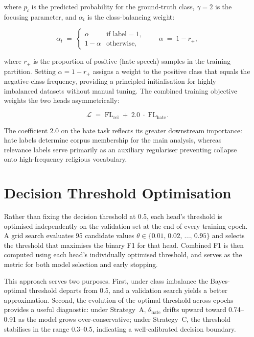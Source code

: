 \documentclass[../CLthesis.tex]{subfiles}
\begin{document}
\noindent where $p_t$ is the predicted probability for the ground-truth class, $\gamma = 2$ is the focusing parameter, and $\alpha_t$ is the class-balancing weight:

\begin{equation}
  \alpha_t \;=\; \begin{cases} \alpha & \text{if label} = 1, \\ 1 - \alpha & \text{otherwise,} \end{cases}
  \qquad \alpha \;=\; 1 - r_+,
  \label{eq:alpha}
\end{equation}

\noindent where $r_+$ is the proportion of positive (hate speech) samples in the training partition. Setting $\alpha = 1 - r_+$ assigns a weight to the positive class that equals the negative-class frequency, providing a principled initialisation for highly imbalanced datasets without manual tuning. The combined training objective weights the two heads asymmetrically:

\begin{equation}
  \mathcal{L} \;=\; \mathrm{FL}_\mathrm{rel} \;+\; 2.0\;\cdot\;\mathrm{FL}_\mathrm{hate}.
  \label{eq:combined-loss}
\end{equation}

\noindent The coefficient $2.0$ on the hate task reflects its greater downstream importance: hate labels determine corpus membership for the main analysis, whereas relevance labels serve primarily as an auxiliary regulariser preventing collapse onto high-frequency religious vocabulary.


\section{Decision Threshold Optimisation}
\label{sec:app-threshold}

Rather than fixing the decision threshold at 0.5, each head's threshold is optimised independently on the validation set at the end of every training epoch. A grid search evaluates 95 candidate values $\theta \in \{0.01,\,0.02,\,\ldots,\,0.95\}$ and selects the threshold that maximises the binary F1 for that head. Combined F1 is then computed using each head's individually optimised threshold, and serves as the metric for both model selection and early stopping.

This approach serves two purposes. First, under class imbalance the Bayes-optimal threshold departs from 0.5, and a validation search yields a better approximation. Second, the evolution of the optimal threshold across epochs provides a useful diagnostic: under Strategy~A, $\theta_\mathrm{hate}$ drifts upward toward 0.74--0.91 as the model grows over-conservative; under Strategy~C, the threshold stabilises in the range 0.3--0.5, indicating a well-calibrated decision boundary.
\end{document}
